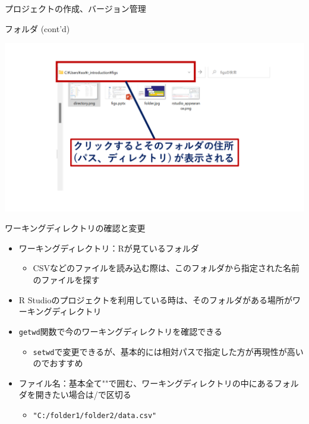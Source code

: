 \documentclass[
  ignorenonframetext,
]{beamer}
\providecommand{\tightlist}{%
  \setlength{\itemsep}{0pt}\setlength{\parskip}{0pt}}
\begin{document}
\begin{frame}[fragile]{プロジェクトの作成、バージョン管理}
\begin{block}{フォルダ (cont'd)}
\protect\hypertarget{ux30d5ux30a9ux30ebux30c0-contd}{}
\begin{center}\includegraphics[width=0.95\linewidth]{figs/directory_system2} \end{center}
\end{block}

\begin{block}{ワーキングディレクトリの確認と変更}
\protect\hypertarget{ux30efux30fcux30adux30f3ux30b0ux30c7ux30a3ux30ecux30afux30c8ux30eaux306eux78baux8a8dux3068ux5909ux66f4}{}
\begin{itemize}
\tightlist
\item
  ワーキングディレクトリ：Rが見ているフォルダ

  \begin{itemize}
  \tightlist
  \item
    CSVなどのファイルを読み込む際は、このフォルダから指定された名前のファイルを探す
  \end{itemize}
\item
  R
  Studioのプロジェクトを利用している時は、そのフォルダがある場所がワーキングディレクトリ
\item
  \texttt{getwd}関数で今のワーキングディレクトリを確認できる

  \begin{itemize}
  \tightlist
  \item
    \texttt{setwd}で変更できるが、基本的には相対パスで指定した方が再現性が高いのでおすすめ
  \end{itemize}
\item
  ファイル名：基本全て""で囲む、ワーキングディレクトリの中にあるフォルダを開きたい場合は/で区切る

  \begin{itemize}
  \tightlist
  \item
    \texttt{"C:/folder1/folder2/data.csv"}
  \end{itemize}
\end{itemize}
\end{block}


\end{frame}
\end{document}
